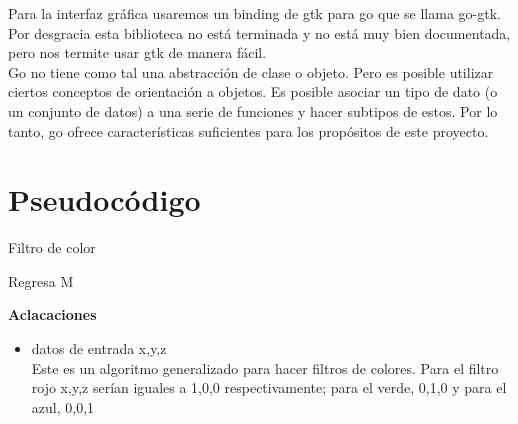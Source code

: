 \documentclass[11pt]{article}
\begin{document}
Para la interfaz gráfica usaremos un binding de gtk para go que se
llama go-gtk. Por desgracia esta biblioteca no está terminada y no
está muy bien documentada, pero nos termite usar gtk de manera fácil.\\

Go no tiene como tal una abstracción de clase o objeto. Pero es
posible utilizar ciertos conceptos de orientación a objetos. Es
posible asociar un tipo de dato (o un conjunto de datos) a una serie
de funciones y hacer subtipos de estos. Por lo tanto, go ofrece
características suficientes para los propósitos de este proyecto.\\

\section{Pseudocódigo}
\begin{algorithm}[H] %
\caption{Filtro de color}
\label{ML:Algorithm1}
\SetAlgoLined
{}
\LinesNumbered
\SetAlgoVlined
{}
Regresa M\;
\end{algorithm}

\vspace{20px}
\textbf{Aclacaciones}
\begin{itemize}
\item datos de entrada x,y,z \\

  Este es un algoritmo generalizado para hacer filtros de
  colores. Para el filtro rojo x,y,z serían iguales a 1,0,0
  respectivamente; para el verde, 0,1,0 y para el azul, 0,0,1 \\

\end{itemize}
\end{document}
